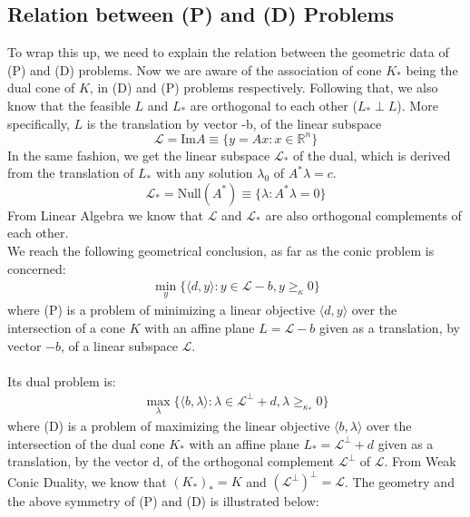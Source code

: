 \documentclass[12pt]{article}
\newcommand{\R}{\mathbb{R}}
\begin{document}
     \subsection{Relation between (P) and (D) Problems}
     To wrap this up, we need to explain the relation between the geometric data of (P) and (D) problems. Now we are aware of the association of cone $K_*$ being the dual cone of $K$, in (D) and (P) problems respectively. Following that, we also know that the feasible $L$ and $L_*$ are orthogonal to each other ($L_* \perp L$). More specifically, $L$ is the translation by vector -b, of the linear subspace 
     $$\mathcal{L} = \text{Im}A \equiv \{ y = Ax : x \in \R^n \} $$
     In the same fashion, we get the linear subspace $\mathcal{L_*}$ of the dual,  which is derived from the translation of $L_*$ with any solution $\lambda_0$ of $A^*\lambda = c$.
     $$\mathcal{L_*} = \mathrm{Null}(A^*) \equiv \{ \lambda : A^* \lambda = 0
     \}$$
     From Linear Algebra we know that $\mathcal{L}$ and $\mathcal{L_*}$ are also orthogonal complements of each other. \\
     We reach the following geometrical conclusion, as far as the conic problem is concerned: 
     \begin{align*}
     \min\limits_{y}\{ \langle d,y \rangle : y \in \mathcal{L}-b, y \geq_{\kappa} 0 \}
     \tag{P}
     \end{align*}
     where (P) is a problem of minimizing a linear objective $\langle d, y \rangle$ over the intersection of a cone $K$ with an affine plane $L = \mathcal{L} - b$ given as a translation, by vector $-b$, of a linear subspace $\mathcal{L}$. \\ \\
     Its dual problem is: 
     \begin{align*}
     \max\limits_{\lambda}\{ \langle b,\lambda \rangle : \lambda \in \mathcal{L}^{\perp}+d , \lambda \geq_{\kappa_*} 0 \}
     \tag{D}
     \end{align*}
     where (D) is a problem of maximizing the linear objective $\langle b, \lambda \rangle$ over the intersection of the dual cone $K_*$ with an affine plane $L_* = \mathcal{L}^{\perp}+d$ given as a translation, by the vector d, of the orthogonal complement $\mathcal{L}^\perp$ of $\mathcal{L}$. \newpage
     From Weak Conic Duality, we know that $(K_*)_* = K$ and $(\mathcal{L}^\perp)^\perp = \mathcal{L}$. The geometry and the above symmetry of (P) and (D) is illustrated below: 
\end{document}
